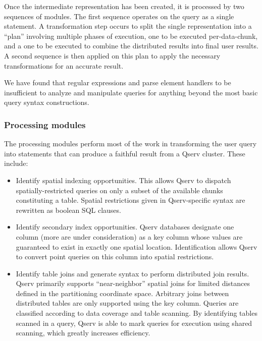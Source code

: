 \documentclass[DM,lsstdraft,toc]{lsstdoc}
\begin{document}
Once the intermediate representation has been created, it is processed by two
sequences of modules. The first sequence operates on the query as a single
statement. A transformation step occurs to split the single representation
into a ``plan'' involving multiple phases of execution, one to be executed
per-data-chunk, and a one to be executed to combine the distributed results
into final user results. A second sequence is then applied on this plan to
apply the necessary transformations for an accurate result.

We have found that regular expressions and parse element handlers to be
insufficient to analyze and manipulate queries for anything beyond the
most basic query syntax constructions.

\subsubsection{Processing modules}\label{processing-modules}

The processing modules perform most of the work in transforming the user
query into statements that can produce a faithful result from a Qserv
cluster. These include:

\begin{itemize}
\item
  Identify spatial indexing opportunities. This allows Qserv to dispatch
  spatially-restricted queries on only a subset of the available chunks
  constituting a table. Spatial restrictions given in Qserv-specific
  syntax are rewritten as boolean SQL clauses.
\item
  Identify secondary index opportunities. Qserv databases designate one
  column (more are under consideration) as a key column whose values
  are guaranteed to exist in exactly one spatial location. Identification
  allows Qserv to convert point queries on this column into spatial
  restrictions.
\item
  Identify table joins and generate syntax to perform distributed join
  results. Qserv primarily supports ``near-neighbor'' spatial joins for
  limited distances defined in the partitioning coordinate space.
  Arbitrary joins between distributed tables are only supported using
  the key column. Queries are classified according to data coverage and table
  scanning. By identifying tables scanned in a query, Qserv is able to
  mark queries for execution using shared scanning, which greatly
  increases efficiency.
\end{itemize}
\end{document}
